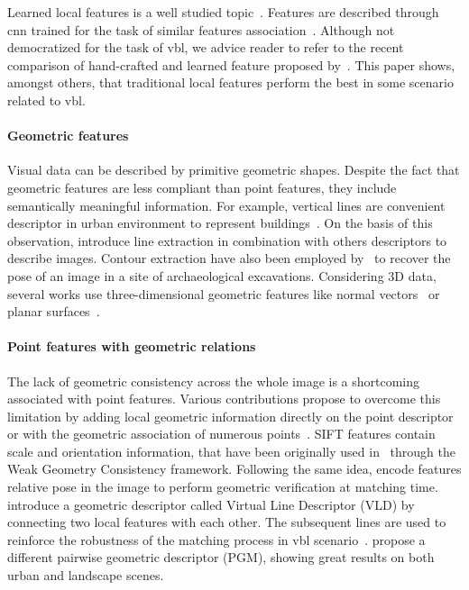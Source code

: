         Learned local features is a well studied topic~\citep{Carlevaris-Bianco2014,Paulin2015}. Features are described through \ac{cnn} trained for the task of similar features association~\citep{Yi2016a}. Although not democratized for the task of \ac{vbl}, we advice reader to refer to the recent comparison of hand-crafted and learned feature proposed by~\citet{Schonberger2017}. This paper shows, amongst others, that traditional local features perform the best in some scenario related to \ac{vbl}.

		\paragraph{Geometric features}
		 	Visual data can be described by primitive geometric shapes. Despite the fact that geometric features are less compliant than point features, they include semantically meaningful information. For example, vertical lines are convenient descriptor in urban environment to represent buildings~\citep{Arth2015,Morago2016,Ramalingam2011}. On the basis of this observation, \citet{Hays2008} introduce line extraction in combination with others descriptors to describe images.  Contour extraction have also been employed by~\citet{Russell2011} to recover the pose of an image in a site of archaeological excavations. Considering 3D data, several works use three-dimensional geometric features like normal vectors~\citep{Li2016} or planar surfaces~\citep{Fernandez-Moral2013}.
			
		\paragraph{Point features with geometric relations}
        	The lack of geometric consistency across the whole image is a shortcoming associated with point features. Various contributions propose to overcome this limitation by adding local geometric information directly on the point descriptor~\citep{Baatz2012,Jegou2008} or with the geometric association of numerous points~\citep{Liu2012,Li2015}. SIFT features contain scale and orientation information, that have been originally used in~\citep{Jegou2008} through the Weak Geometry Consistency framework. Following the same idea, \citet{Baatz2012} encode features relative pose in the image to perform geometric verification at matching time. \citet{Liu2012} introduce a geometric descriptor called Virtual Line Descriptor (VLD) by connecting two local features with each other. The subsequent lines are used to reinforce the robustness of the matching process in \ac{vbl} scenario~\citep{Majdik2013}. \citet{Li2015} propose a different pairwise geometric descriptor (PGM), showing great results on both urban and landscape scenes.
			
